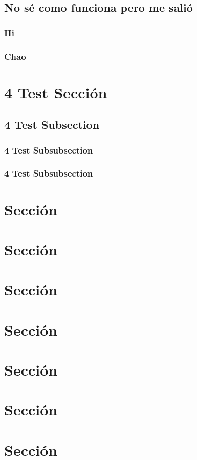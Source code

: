 	\subsection{No sé como funciona pero me salió}
		\subsubsection{Hi}
		\subsubsection{Chao}
		
\section{4 Test Sección}
\subsection{4 Test Subsection}
\subsubsection{4 Test Subsubsection}
\subsubsection{4 Test Subsubsection}
\section{Sección}
\section{Sección}
\section{Sección}
\section{Sección}
\section{Sección}
\section{Sección}
\section{Sección}
